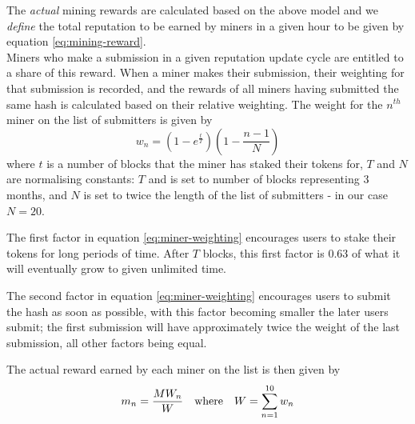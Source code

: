 The \emph{actual} mining rewards are calculated based on the above model and we \emph{define} the total reputation to be earned by miners in a given hour to be given by equation \eqref{eq:mining-reward}.\\

Miners who make a submission in a given reputation update cycle are entitled to a share of this reward. When a miner makes their submission, their weighting for that submission is recorded, and the rewards of all miners having submitted the same hash is calculated based on their relative weighting. The weight for the $n^{th}$ miner on the list of submitters is given by
\begin{equation}\label{eq:miner-weighting}
 w_n = \left(1 - e^{\frac{t}{T}}\right) \left( 1 - \frac{n-1}{N} \right)
\end{equation}
where $t$ is a number of blocks that the miner has staked their tokens for, $T$ and $N$ are normalising constants: $T$ and is set to number of blocks representing 3 months, and $N$ is set to twice the length of the list of submitters - in our case $N=20$.

The first factor in equation \eqref{eq:miner-weighting} encourages users to stake their tokens for long periods of time. After $T$ blocks, this first factor is 0.63 of what it will eventually grow to given unlimited time. 

The second factor in equation \eqref{eq:miner-weighting} encourages users to submit the hash as soon as possible, with this factor becoming smaller the later users submit; the first submission will have approximately twice the weight of the last submission, all other factors being equal.

The actual reward earned by each miner on the list is then given by
\begin{equation}\label{eq:miner-payout}
 m_n = \frac{M W_n}{W} \quad \textnormal{where} \quad W = \sum_{n=1}^{10} w_n
\end{equation}


